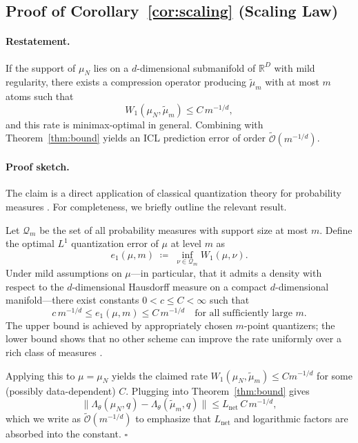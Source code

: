 \documentclass{article}
\theoremstyle{plain}
\theoremstyle{definition}
\theoremstyle{remark}
\newcommand{\muN}{\mu_N} %
\newcommand{\Wass}[1]{W_{#1}} %
\begin{document}
\subsection{Proof of Corollary~\ref{cor:scaling} (Scaling Law)}
\label{app:scaling}

\paragraph{Restatement.}
If the support of $\muN$ lies on a $d$-dimensional submanifold of $\mathbb{R}^D$ with
mild regularity, there exists a compression operator producing $\tilde\mu_m$ with at
most $m$ atoms such that
\[
    \Wass{1}(\muN,\tilde\mu_m)
    \le
    C \, m^{-1/d},
\]
and this rate is minimax-optimal in general. Combining with
Theorem~\ref{thm:bound} yields an ICL prediction error of order
$\tilde{\mathcal{O}}(m^{-1/d})$.

\paragraph{Proof sketch.}
The claim is a direct application of classical quantization theory for probability
measures \citep{graf2000foundations,villani2009optimal}. For completeness, we briefly
outline the relevant result.

Let $\mathcal{Q}_m$ be the set of all probability measures with support size at most $m$.
Define the optimal $L^1$ quantization error of $\mu$ at level $m$ as
\[
    e_1(\mu,m)
    \;\coloneqq\;
    \inf_{\nu\in\mathcal{Q}_m} \Wass{1}(\mu,\nu).
\]
Under mild assumptions on $\mu$—in particular, that it admits a density with respect to
the $d$-dimensional Hausdorff measure on a compact $d$-dimensional manifold—there exist
constants $0<c\le C<\infty$ such that
\[
    c\,m^{-1/d}
    \le
    e_1(\mu,m)
    \le
    C\,m^{-1/d}
    \quad\text{for all sufficiently large }m.
\]
The upper bound is achieved by appropriately chosen $m$-point quantizers; the lower bound
shows that no other scheme can improve the rate uniformly over a rich class of measures
\citep{graf2000foundations}.

Applying this to $\mu=\muN$ yields the claimed rate
$\Wass{1}(\muN,\tilde\mu_m) \le C m^{-1/d}$ for some (possibly data-dependent) $C$.
Plugging into Theorem~\ref{thm:bound} gives
\[
    \big\|
        \Lambda_\theta(\muN,q)
        -
        \Lambda_\theta(\tilde\mu_m,q)
    \big\|
    \le
    L_{\text{net}}\,C\,m^{-1/d},
\]
which we write as $\tilde{\mathcal{O}}(m^{-1/d})$ to emphasize that $L_{\text{net}}$ and
logarithmic factors are absorbed into the constant. \hfill$\square$
\end{document}
